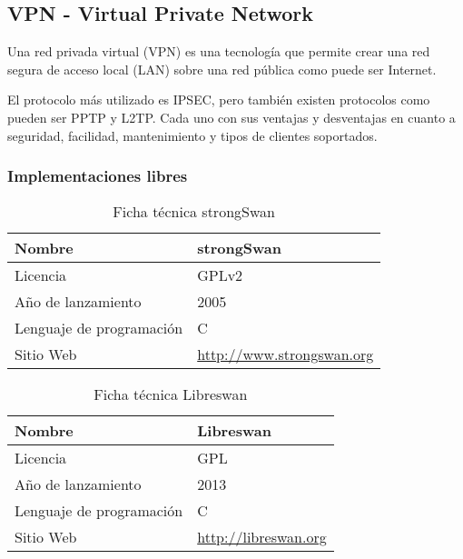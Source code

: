 \subsection {VPN - Virtual Private Network}

Una red privada virtual (VPN) es una tecnología que permite crear una red segura de acceso local (LAN) sobre una red pública como puede ser Internet.

\bigskip
El protocolo más utilizado es IPSEC, pero también existen protocolos como pueden ser PPTP y L2TP. Cada uno con sus ventajas y desventajas en cuanto a seguridad, facilidad, mantenimiento y tipos de clientes soportados.

\subsubsection {Implementaciones libres}

\begin{table}[H]
\begin{tabular}{|l|l|}
\hline
Nombre                   & strongSwan                       \\ \hline
Licencia                 & GPLv2                            \\ \hline
Año de lanzamiento       & 2005                           \\ \hline
Lenguaje de programación & C                              \\ \hline
Sitio Web                & \url{http://www.strongswan.org} \\ \hline
\end{tabular}
\caption{Ficha técnica strongSwan}
\end{table}

\begin{table}[H]
\begin{tabular}{|l|l|}
\hline
Nombre                   & Libreswan                       \\ \hline
Licencia                 & GPL                            \\ \hline
Año de lanzamiento       & 2013                           \\ \hline
Lenguaje de programación & C                              \\ \hline
Sitio Web                & \url{http://libreswan.org} \\ \hline
\end{tabular}
\caption{Ficha técnica Libreswan}
\end{table}


